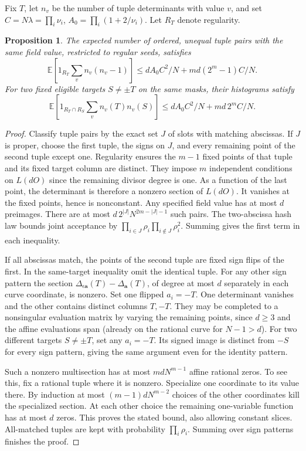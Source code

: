 \documentclass[11pt]{article}
\newtheorem{proposition}{Proposition}
\newcommand{\E}{\mathbb E}
\begin{document}
Fix $T$, let $n_v$ be the number of tuple determinants with value $v$,
and set $C=N\lambda=\prod_i\nu_i$, $A_0=\prod_i(1+2/\nu_i)$.
Let $R_T$ denote regularity.
\begin{proposition}
The expected number of ordered, unequal tuple pairs with the same field
value, restricted to regular seeds, satisfies
\[
 \E\left[1_{R_T}\sum_v n_v(n_v-1)\right]
 \le d A_0 C^2/N+md(2^m-1)C/N .
\]
For two fixed eligible targets $S\ne\pm T$ on the same masks, their
histograms satisfy
\[
 \E\left[1_{R_T\cap R_S}\sum_v n_v(T)n_v(S)\right]
 \le d A_0 C^2/N+md\,2^m C/N .
\]
\end{proposition}
\begin{proof}
Classify tuple pairs by the exact set $J$ of slots with matching
abscissas. If $J$ is proper, choose the first tuple, the signs on $J$,
and every remaining point of the second tuple except one. Regularity
ensures the $m-1$ fixed points of that tuple and its fixed target column
are distinct. They impose $m$ independent conditions on $L(dO)$ since
the remaining divisor degree is one. As a function of the last point,
the determinant is therefore a nonzero section of $L(dO)$. It vanishes
at the fixed points, hence is nonconstant. Any specified field value has
at most $d$ preimages. There are at most
$d\,2^{|J|}N^{2m-|J|-1}$ such pairs. The two-abscissa hash law
bounds joint acceptance by $\prod_{i\in J}\rho_i\prod_{i\notin J}\rho_i^2$.
Summing gives the first term in each inequality.

If all abscissas match, the points of the second tuple are fixed sign
flips of the first. In the same-target inequality omit the identical
tuple. For any other sign pattern the section
$\Delta_{\epsilon\mathbf a}(T)-\Delta_{\mathbf a}(T)$, of degree at
most $d$ separately in each curve coordinate, is nonzero. Set one
flipped $a_i=-T$. One determinant vanishes and the other contains
distinct columns $T,-T$. They may be completed to a nonsingular
evaluation matrix by varying the remaining points, since $d\ge3$ and
the affine evaluations span (already on the rational curve for $N-1>d$).
For two different targets $S\ne\pm T$, set any $a_i=-T$. Its signed
image is distinct from $-S$ for every sign pattern, giving the same
argument even for the identity pattern.

Such a nonzero multisection has at most $md N^{m-1}$ affine rational
zeros. To see this, fix a rational tuple where it is nonzero. Specialize
one coordinate to its value there. By induction at most
$(m-1)d N^{m-2}$ choices of the other coordinates kill the specialized
section. At each other choice the remaining one-variable function has
at most $d$ zeros. This proves the stated bound, also allowing constant
slices. All-matched tuples are kept with probability $\prod_i\rho_i$.
Summing over sign patterns finishes the proof.
\end{proof}
\end{document}
